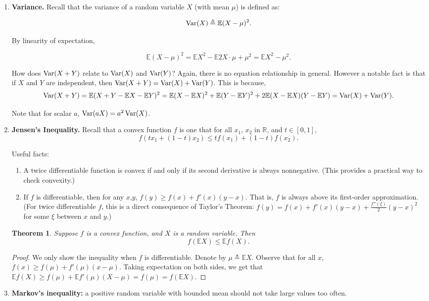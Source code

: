 \documentclass{article}
\newtheorem{theorem}{Theorem}
\DeclareMathOperator*{\Var}{{\rm Var}}
\newcommand{\RR}{\mathbb{R}} %
\newcommand{\EE}{\mathbb{E}} %
\newcommand{\defeq}{\triangleq}
\begin{document}
\begin{enumerate}
\item \textbf{Variance.} Recall
that the variance of a random variable $X$ (with mean $\mu$) is defined as:

\[ \Var(X) \defeq \EE (X - \mu)^2. \]

By linearity of expectation,

\[ \EE (X - \mu)^2 = \EE X^2 - \EE 2 X \cdot \mu + \mu^2 = \EE X^2 - \mu^2. \]

How does $\Var(X+Y)$ relate to $\Var(X)$ and $\Var(Y)$? Again, there is no equation relationship in general. However a notable fact is that if $X$ and $Y$ are independent, then $\Var(X+Y) = \Var(X) + \Var(Y)$. This is because,
\[ \Var(X+Y) = \EE(X + Y - \EE X - \EE Y)^2 = \EE(X - \EE X)^2 + \EE(Y - \EE Y)^2 + 2 \EE(X - \EE X)(Y - \EE Y) = \Var(X) + \Var(Y). \]

Note that for scalar $a$, $\Var(a X) = a^2 \Var(X)$.

\item \textbf{Jensen's Inequality.} Recall that a convex function $f$ is one that
for all $x_1$, $x_2$ in $\RR$, and $t \in [0,1]$,
\[ f(t x_1 + (1-t) x_2) \leq t f(x_1) + (1-t) f(x_2). \]

Useful facts:
\begin{enumerate}
\item A twice differentiable function is convex if and only if its second derivative is always nonnegative. (This provides a practical way to check convexity.)
\item If $f$ is differentiable, then for any $x$,$y$, $f(y) \geq f(x) + f'(x)(y-x)$.
That is, $f$ is always above its first-order approximation. (For twice differentiable $f$, this is a direct consequence of Taylor's Theorem: $f(y) = f(x) + f'(x)(y-x) + \frac{f''(\xi)}{2}(y-x)^2$ for some $\xi$ between $x$ and $y$.)
\end{enumerate}

\begin{theorem}
Suppose $f$ is a convex function, and $X$ is a random variable. Then
\[ f(\EE X) \leq \EE f(X). \]
\end{theorem}
\begin{proof}
  We only show the inequality when $f$ is differentiable.
  Denote by $\mu \defeq \EE X$.
  Observe that for all $x$, $f(x) \geq f(\mu) + f'(\mu)(x-\mu)$.
  Taking expectation on both sides, we get that
  $\EE f(X) \geq f(\mu) + \EE f'(\mu)(X-\mu) = f(\mu) = f(\EE X)$.
\end{proof}

\item \textbf{Markov's inequality:} a positive random variable with bounded
mean should not take large values too often.


\end{enumerate}
\end{document}
